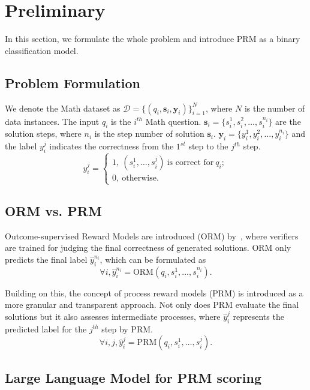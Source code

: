 \section{Preliminary}
\label{sec:preliminary}

In this section, we formulate the whole problem and introduce PRM as a binary classification model.

\subsection{Problem Formulation}
We denote the Math dataset as $\mathcal{D}=\{(q_i,\mathbf{s}_i,\mathbf{y}_i)\}_{i=1}^N$, where $N$ is the number of data instances. 
The input $q_i$ is the $i^{th}$ Math question. $\mathbf{s}_i = \{ s^1_i,s^2_i,\ldots, s^{n_i}_i\}$ are the solution steps, where $n_i$ is the step number of solution $\mathbf{s}_i$. $\mathbf{y}_i = \{ y^1_i, y^2_i, \ldots, y^{n_i}_i \}$ and the label $y^j_i$ indicates the correctness from the $1^{st}$ step to the $j^{th}$ step.
\begin{equation}
	y^j_{i} = 
		\begin{cases}
		    1,~ (s^1_i,\ldots,s^j_i)~\text{is correct for} ~q_i; \\
			0,~ \text{otherwise.} 
		\end{cases}
\end{equation}
\subsection{ORM vs. PRM}
Outcome-supervised Reward Models are introduced (ORM) by~\cite{gsm8k}, where verifiers are trained for judging the final correctness of generated solutions. ORM only predicts the final label $\hat{y}^{n_i}_i$, which can be formulated as 
\begin{equation}
	\forall{i},\hat{y}^{n_i}_{i} = \text{ORM}(q_i,s^1_i,\ldots,s^{n_i}_i).
\end{equation}

Building on this, the concept of process reward models (PRM) is introduced as a more granular
 and transparent approach. Not only does PRM evaluate the final solutions but it also assesses intermediate processes, where $\hat{y}^{j}_{i}$ represents the predicted label for the $j^{th}$ step by PRM.
\begin{equation}
	\forall{i,j}, \hat{y}^{j}_{i} = \text{PRM} (q_i,s^1_i,\ldots,s^{j}_i).
\end{equation}

\subsection{Large Language Model for PRM scoring}
\label{llm as for prm scoing}
 
